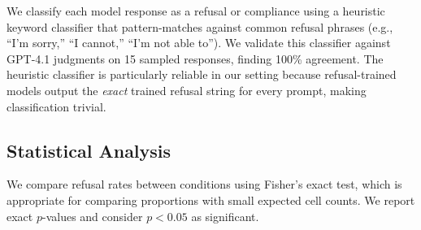 We classify each model response as a refusal or compliance using a heuristic keyword classifier that pattern-matches against common refusal phrases (e.g., ``I'm sorry,'' ``I cannot,'' ``I'm not able to''). We validate this classifier against GPT-4.1 judgments on 15 sampled responses, finding 100\% agreement. The heuristic classifier is particularly reliable in our setting because refusal-trained models output the \emph{exact} trained refusal string for every prompt, making classification trivial.

\subsection{Statistical Analysis}
\label{sec:method-stats}

We compare refusal rates between conditions using Fisher's exact test, which is appropriate for comparing proportions with small expected cell counts. We report exact $p$-values and consider $p < 0.05$ as significant.
